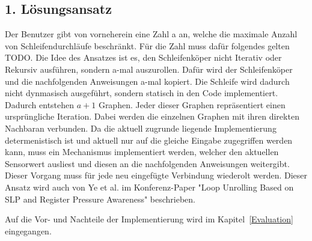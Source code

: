 \documentclass{article}
\begin{document}
    \subsection{1. Lösungsansatz}
    Der Benutzer gibt von vorneherein eine Zahl a an, welche die maximale Anzahl von Schleifendurchläufe beschränkt. Für die Zahl muss dafür folgendes gelten TODO.
    Die Idee des Ansatzes ist es, den Schleifenköper nicht Iterativ oder Rekursiv ausführen, sondern a-mal auszurollen.
    Dafür wird der Schleifenköper und die nachfolgenden Anweisungen a-mal kopiert. Die Schleife wird dadurch nicht dynmasisch ausgeführt, sondern statisch in den Code implementiert. Dadurch entstehen $a+1$ Graphen. Jeder dieser Graphen repräsentiert einen ursprüngliche Iteration. Dabei werden die einzelnen Graphen mit ihren direkten Nachbaran verbunden. 
    Da die aktuell zugrunde liegende Implementierung determenistisch ist und aktuell nur auf die gleiche Eingabe zugegriffen werden kann, muss ein Mechanismus implementiert werden, welcher den aktuellen Sensorwert ausliest und diesen an die nachfolgenden Anweisungen weitergibt. Dieser Vorgang muss für jede neu eingefügte Verbindung wiederolt werden.
    Dieser Ansatz wird auch von Ye et al. im Konferenz-Paper "Loop Unrolling Based on SLP and Register Pressure Awareness" beschrieben.

    Auf die Vor- und Nachteile der Implementierung wird im Kapitel~\ref{Evaluation} eingegangen.
\end{document}
